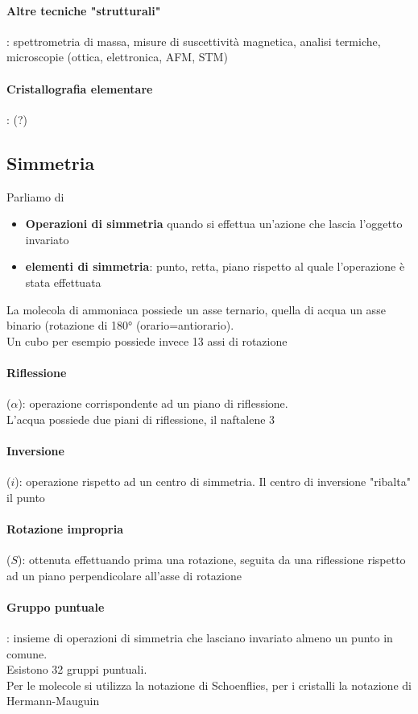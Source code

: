 \documentclass{article}
\begin{document}
\paragraph{Altre tecniche "strutturali"}: spettrometria di massa, misure di suscettività magnetica, analisi termiche, microscopie (ottica, elettronica, AFM, STM)

\paragraph{Cristallografia elementare}: (?)

\subsection{Simmetria}
Parliamo di
\begin{itemize}
    \item \textbf{Operazioni di simmetria} quando si effettua un'azione che lascia l'oggetto invariato
    \item \textbf{elementi di simmetria}: punto, retta, piano rispetto al quale l'operazione è stata effettuata
\end{itemize}
La molecola di ammoniaca possiede un asse ternario, quella di acqua un asse binario (rotazione di 180° (orario=antiorario).\\
Un cubo per esempio possiede invece 13 assi di rotazione
\paragraph{Riflessione}($\alpha$): operazione corrispondente ad un piano di riflessione. \\
L'acqua possiede due piani di riflessione, il naftalene 3
\paragraph{Inversione}($i$): operazione rispetto ad un centro di simmetria. Il centro di inversione "ribalta" il punto
\paragraph{Rotazione impropria}($S$): ottenuta effettuando prima una rotazione, seguita da una riflessione rispetto ad un piano perpendicolare all'asse di rotazione
\paragraph{Gruppo puntuale}: insieme di operazioni di simmetria che lasciano invariato almeno un punto in comune. \\
Esistono 32 gruppi puntuali.\\
Per le molecole si utilizza la notazione di Schoenflies, per i cristalli la notazione di Hermann-Mauguin
\end{document}
